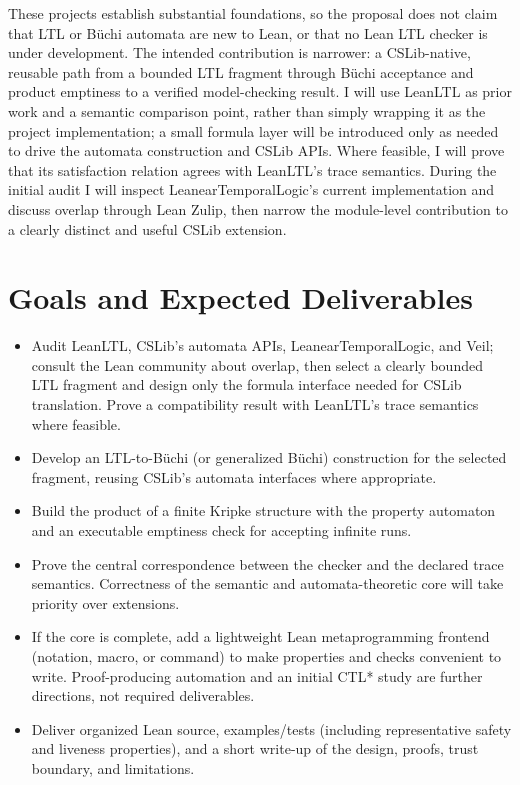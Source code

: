 \documentclass[10pt,a4paper]{article}
\begin{document}
These projects establish substantial foundations, so the proposal does not
claim that LTL or Büchi automata are new to Lean, or that no Lean LTL checker is
under development. The intended contribution is narrower: a CSLib-native,
reusable path from a bounded LTL fragment through Büchi acceptance and product
emptiness to a verified model-checking result. I will use LeanLTL as prior work
and a semantic comparison point, rather than simply wrapping it as the project
implementation; a small formula layer will be introduced only as needed to
drive the automata construction and CSLib APIs. Where feasible, I will prove
that its satisfaction relation agrees with LeanLTL's trace semantics. During
the initial audit I will inspect LeanearTemporalLogic's current implementation
and discuss overlap through Lean Zulip, then narrow the module-level contribution
to a clearly distinct and useful CSLib extension.

\section{Goals and Expected Deliverables}

\begin{itemize}
  \item Audit LeanLTL, CSLib's automata APIs, LeanearTemporalLogic, and Veil;
        consult the Lean community about overlap, then select a clearly bounded
        LTL fragment and design only the formula interface needed for CSLib
        translation. Prove a compatibility result with LeanLTL's trace
        semantics where feasible.
  \item Develop an LTL-to-Büchi (or generalized Büchi) construction for the
        selected fragment, reusing CSLib's automata interfaces where appropriate.
  \item Build the product of a finite Kripke structure with the property
        automaton and an executable emptiness check for accepting infinite runs.
  \item Prove the central correspondence between the checker and the declared
        trace semantics. Correctness of the semantic and automata-theoretic core
        will take priority over extensions.
  \item If the core is complete, add a lightweight Lean metaprogramming frontend
        (notation, macro, or command) to make properties and checks convenient to
        write. Proof-producing automation and an initial CTL* study are further
        directions, not required deliverables.
  \item Deliver organized Lean source, examples/tests (including representative
        safety and liveness properties), and a short write-up of the design,
        proofs, trust boundary, and limitations.
\end{itemize}
\end{document}
